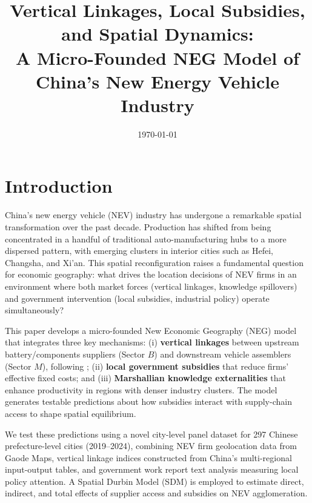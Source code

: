 \documentclass[11pt,a4paper]{article}
\begin{document}
\title{\textbf{Vertical Linkages, Local Subsidies, and Spatial Dynamics:}\\
       \large A Micro-Founded NEG Model of China's New Energy Vehicle Industry}

\author{}
\date{\today}
\maketitle

\section{Introduction}

China's new energy vehicle (NEV) industry has undergone a remarkable spatial transformation over the past decade. Production has shifted from being concentrated in a handful of traditional auto-manufacturing hubs to a more dispersed pattern, with emerging clusters in interior cities such as Hefei, Changsha, and Xi'an. This spatial reconfiguration raises a fundamental question for economic geography: what drives the location decisions of NEV firms in an environment where both market forces (vertical linkages, knowledge spillovers) and government intervention (local subsidies, industrial policy) operate simultaneously?

This paper develops a micro-founded New Economic Geography (NEG) model that integrates three key mechanisms: (i) \textbf{vertical linkages} between upstream battery/components suppliers (Sector $B$) and downstream vehicle assemblers (Sector $M$), following \citet{venables1996equilibrium}; (ii) \textbf{local government subsidies} that reduce firms' effective fixed costs; and (iii) \textbf{Marshallian knowledge externalities} that enhance productivity in regions with denser industry clusters. The model generates testable predictions about how subsidies interact with supply-chain access to shape spatial equilibrium.

We test these predictions using a novel city-level panel dataset for 297 Chinese prefecture-level cities (2019--2024), combining NEV firm geolocation data from Gaode Maps, vertical linkage indices constructed from China's multi-regional input-output tables, and government work report text analysis measuring local policy attention. A Spatial Durbin Model (SDM) is employed to estimate direct, indirect, and total effects of supplier access and subsidies on NEV agglomeration.
\end{document}
